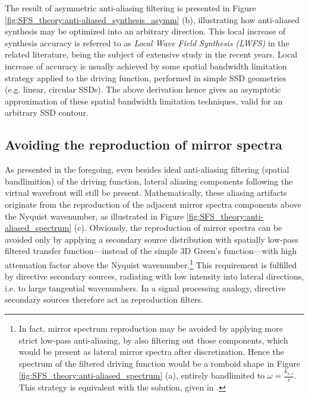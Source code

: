 The result of asymmetric anti-aliasing filtering is presented in Figure \ref{fig:SFS_theory:anti-aliased_synthesis_asymm} (b), illustrating how anti-aliased synthesis may be optimized into an arbitrary direction.
This local increase of synthesis accuracy is referred to as \emph{Local Wave Field Synthesis (LWFS)} in the related literature, being the subject of extensive study in the recent years. \cite{ahrens2010local, 5946329, spors2011local, Winter15:EURONOISE, Winter15:AES, Hahn17:EUSIPCO, Hahn16:AES, Winter2016-TASL}
Local increase of accuracy is usually achieved by some spatial bandwidth limitation strategy applied to the driving function, performed in simple SSD geometries (e.g. linear, circular SSDs).
The above derivation hence gives an asymptotic approximation of these spatial bandwidth limitation techniques, valid for an arbitrary SSD contour.

\subsection{Avoiding the reproduction of mirror spectra}

As presented in the foregoing, even besides ideal anti-aliasing filtering (spatial bandlimition) of the driving function, lateral aliasing components following the virtual wavefront will still be present.
Mathematically, these aliasing artifacts originate from the reproduction of the adjacent mirror spectra components above the Nyquist wavenumber, as illustrated in Figure \ref{fig:SFS_theory:anti-aliased_spectrum} (c).
Obviously, the reproduction of mirror spectra can be avoided only by applying a secondary source distribution with spatially low-pass filtered transfer function---instead of the simple 3D Green's function---with high attenuation factor above the Nyquist wavenumber.\footnote{In fact, mirror spectrum reproduction may be avoided by applying more strict low-pass anti-aliasing, by also filtering out those components, which would be present as lateral mirror spectra after discretization. 
Hence the spectrum of the filtered driving function would be a romboid shape in Figure \ref{fig:SFS_theory:anti-aliased_spectrum} (a), entirely bandlimited to $\omega = \frac{k_{x,s}}{c}$.
This strategy is equivalent with the solution, given in \cite{Winter2018:GeometricModel}.}
This requirement is fulfilled by directive secondary sources, radiating with low intensity into lateral directions, i.e. to large tangential wavenumbers.
In a signal processing analogy, directive secondary sources therefore act as reproduction filters.

